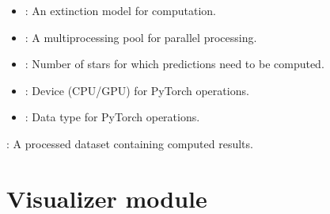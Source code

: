 \documentclass[letterpaper,10pt,english]{sphinxmanual}
\begin{document}
\begin{fulllineitems}
\begin{fulllineitems}
\begin{description}
\begin{itemize}
\item {} 
\sphinxAtStartPar
{}: An extinction model for computation.

\item {} 
\sphinxAtStartPar
{}: A multiprocessing pool for parallel processing.

\item {} 
\sphinxAtStartPar
{}: Number of stars for which predictions need to be computed.

\item {} 
\sphinxAtStartPar
{}: Device (CPU/GPU) for PyTorch operations.

\item {} 
\sphinxAtStartPar
{}: Data type for PyTorch operations.

\end{itemize}

\sphinxAtStartPar
{}: A processed dataset containing computed results.

\end{description}

\end{fulllineitems}


\end{fulllineitems}


\sphinxstepscope


\section{Visualizer module}
\label{\detokenize{Visualizer:module-Visualizer}}\label{\detokenize{Visualizer:visualizer-module}}\label{\detokenize{Visualizer::doc}}
\end{document}

